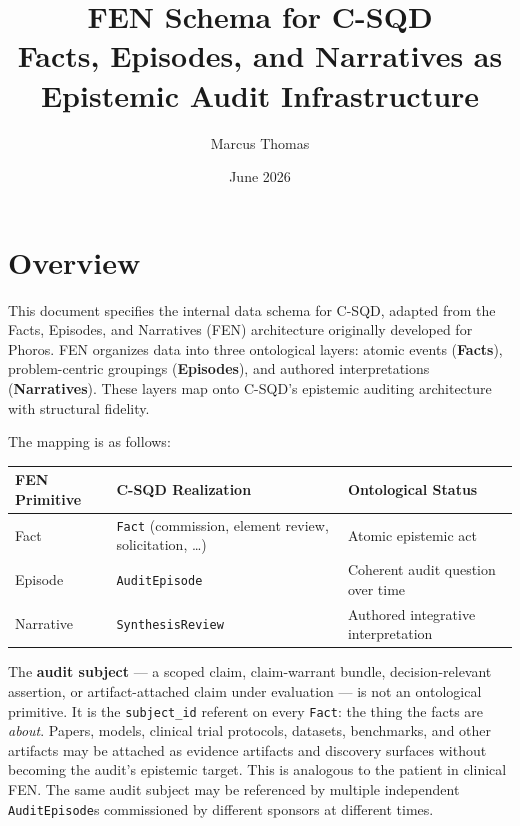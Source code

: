 \documentclass[11pt]{article}
\title{FEN Schema for C-SQD\\[0.4em]
\large Facts, Episodes, and Narratives as Epistemic Audit Infrastructure}
\author{Marcus Thomas}
\date{June 2026}
\begin{document}
\maketitle
\tableofcontents
\newpage

\section{Overview}

This document specifies the internal data schema for C-SQD, adapted from the
Facts, Episodes, and Narratives (FEN) architecture originally developed for
Phoros. FEN organizes data into three ontological layers: atomic events
(\textbf{Facts}), problem-centric groupings (\textbf{Episodes}), and authored
interpretations (\textbf{Narratives}). These layers map onto C-SQD's epistemic
auditing architecture with structural fidelity.

The mapping is as follows:

\begin{center}
\renewcommand{\arraystretch}{1.4}
\begin{tabular}{l l l}
\textbf{FEN Primitive} & \textbf{C-SQD Realization} & \textbf{Ontological Status} \\
\hline
Fact      & \texttt{Fact} (commission, element review, solicitation, \ldots) & Atomic epistemic act \\
Episode   & \texttt{AuditEpisode}       & Coherent audit question over time \\
Narrative & \texttt{SynthesisReview}    & Authored integrative interpretation \\
\end{tabular}
\end{center}

The \textbf{audit subject} --- a scoped claim, claim-warrant bundle,
decision-relevant assertion, or artifact-attached claim under evaluation --- is
not an ontological primitive. It is the \texttt{subject\_id} referent on every
\texttt{Fact}: the thing the facts are \emph{about}. Papers, models, clinical
trial protocols, datasets, benchmarks, and other artifacts may be attached as
evidence artifacts and discovery surfaces without becoming the audit's
epistemic target. This is analogous to the patient in clinical FEN. The same
audit subject may be referenced by multiple independent \texttt{AuditEpisode}s
commissioned by different sponsors at different times.
\end{document}
